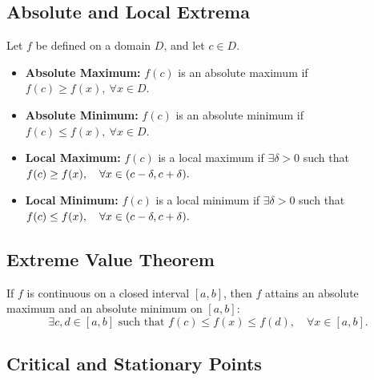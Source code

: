 \documentclass[a4paper,11pt]{article}
\theoremstyle{definition}
\theoremstyle{plain}
\theoremstyle{remark}
\begin{document}


\subsection{Absolute and Local Extrema}

\begin{tcolorbox}
    Let $f$ be defined on a domain $D$, and let $c \in D$.
    \begin{itemize}
        \item \textbf{Absolute Maximum:} $f(c)$ is an absolute maximum if $f(c) \geq f(x),\ \forall x \in D.$
        \item \textbf{Absolute Minimum:} $f(c)$ is an absolute minimum if $f(c) \leq f(x),\ \forall x \in D.$
        \item \textbf{Local Maximum:} $f(c)$ is a local maximum if $\exists \delta > 0$ such that $f(c) \geq f(x),\\ \quad \forall x \in (c - \delta, c + \delta).$
        \item \textbf{Local Minimum:} $f(c)$ is a local minimum if $\exists \delta > 0$ such that $f(c) \leq f(x),\\ \quad \forall x \in (c - \delta, c + \delta).$
    \end{itemize}
\end{tcolorbox}




\subsection{Extreme Value Theorem}

\begin{tcolorbox}
    If $f$ is continuous on a closed interval $[a,b]$, then $f$ attains an absolute maximum and an absolute minimum on $[a,b]$:
    \[
    \exists c,d \in [a,b] \text{ such that } f(c) \leq f(x) \leq f(d),\quad \forall x \in [a,b].
    \]
\end{tcolorbox}




\subsection{Critical and Stationary Points}
\end{document}
